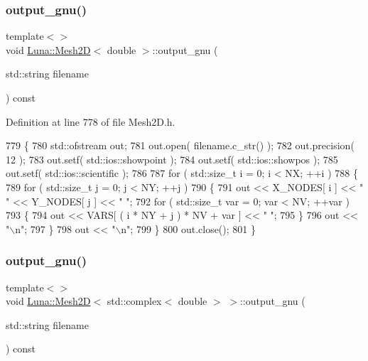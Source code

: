 \subsubsection{\texorpdfstring{output\+\_\+gnu()}{output\_gnu()}\hspace{0.1cm}{\footnotesize\ttfamily [2/3]}}
{\footnotesize\ttfamily template$<$$>$ \\
void \hyperlink{classLuna_1_1Mesh2D}{Luna\+::\+Mesh2D}$<$ double $>$\+::output\+\_\+gnu (\begin{DoxyParamCaption}\item[{std\+::string}]{filename }\end{DoxyParamCaption}) const}



Definition at line 778 of file Mesh2\+D.\+h.


\begin{DoxyCode}
779   \{
780     std::ofstream out;
781     out.open( filename.c\_str() );
782     out.precision( 12 );
783     out.setf( std::ios::showpoint );
784     out.setf( std::ios::showpos );
785     out.setf( std::ios::scientific );
786 
787     \textcolor{keywordflow}{for} ( std::size\_t i = 0; i < NX; ++i )
788     \{
789       \textcolor{keywordflow}{for} ( std::size\_t j = 0; j < NY; ++j )
790       \{
791         out << X\_NODES[ i ] << \textcolor{stringliteral}{" "} << Y\_NODES[ j ] << \textcolor{stringliteral}{" "};
792         \textcolor{keywordflow}{for} ( std::size\_t var = 0; var < NV; ++var )
793         \{
794           out << VARS[ ( i * NY + j ) * NV + var ] << \textcolor{stringliteral}{" "};
795         \}
796         out << \textcolor{stringliteral}{"\(\backslash\)n"};
797       \}
798       out << \textcolor{stringliteral}{"\(\backslash\)n"};
799     \}
800     out.close();
801   \}
\end{DoxyCode}
\mbox{\label{classLuna_1_1Mesh2D_a4b2240afef17ec91c1d926bb56e1f92f}} 
\subsubsection{\texorpdfstring{output\+\_\+gnu()}{output\_gnu()}\hspace{0.1cm}{\footnotesize\ttfamily [3/3]}}
{\footnotesize\ttfamily template$<$$>$ \\
void \hyperlink{classLuna_1_1Mesh2D}{Luna\+::\+Mesh2D}$<$ std\+::complex$<$ double $>$ $>$\+::output\+\_\+gnu (\begin{DoxyParamCaption}\item[{std\+::string}]{filename }\end{DoxyParamCaption}) const}



